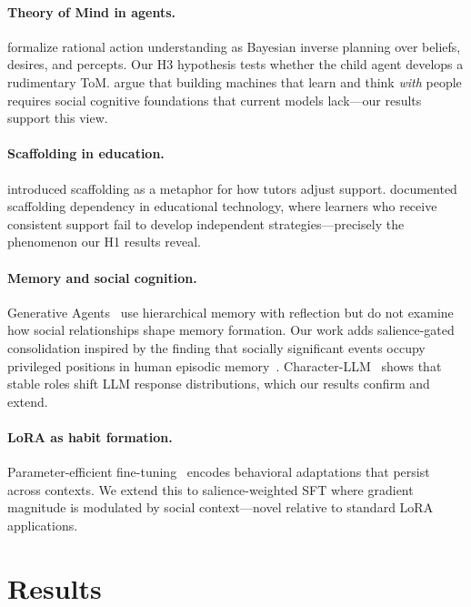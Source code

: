 \documentclass{article}
\begin{document}
\paragraph{Theory of Mind in agents.} \citet{baker2017rational} formalize rational action understanding as Bayesian inverse planning over beliefs, desires, and percepts. Our H3 hypothesis tests whether the child agent develops a rudimentary ToM. \citet{lake2024building} argue that building machines that learn and think \emph{with} people requires social cognitive foundations that current models lack---our results support this view.

\paragraph{Scaffolding in education.} \citet{wood1976role} introduced scaffolding as a metaphor for how tutors adjust support. \citet{puntambekar2005tools} documented scaffolding dependency in educational technology, where learners who receive consistent support fail to develop independent strategies---precisely the phenomenon our H1 results reveal.

\paragraph{Memory and social cognition.} Generative Agents~\citep{park2023generative} use hierarchical memory with reflection but do not examine how social relationships shape memory formation. Our work adds salience-gated consolidation inspired by the finding that socially significant events occupy privileged positions in human episodic memory~\citep{dolcos2004interaction}. Character-LLM~\citep{shao2023character} shows that stable roles shift LLM response distributions, which our results confirm and extend.

\paragraph{LoRA as habit formation.} Parameter-efficient fine-tuning~\citep{hu2022lora} encodes behavioral adaptations that persist across contexts. We extend this to salience-weighted SFT where gradient magnitude is modulated by social context---novel relative to standard LoRA applications.

\section{Results}
\end{document}
